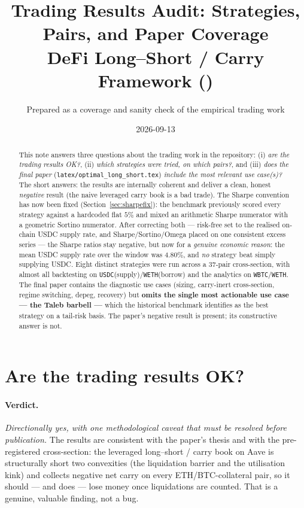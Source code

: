 \documentclass[11pt]{article}
\title{\textbf{Trading Results Audit: Strategies, Pairs, and Paper Coverage}\\[4pt]
\large DeFi Long--Short / Carry Framework (\code{Defi\_interestRate})}
\author{Prepared as a coverage and sanity check of the empirical trading work}
\date{2026-09-13}
\newcommand{\code}[1]{\texttt{\small #1}}
\begin{document}
\maketitle

\begin{abstract}
\noindent This note answers three questions about the trading work in the
repository: (i) \emph{are the trading results OK?}, (ii) \emph{which strategies
were tried, on which pairs?}, and (iii) \emph{does the final paper}
(\code{latex/optimal\_long\_short.tex}) \emph{include the most relevant use
case(s)?} The short answers: the results are internally coherent and deliver a
clean, honest \emph{negative} result (the naive leveraged carry book is a bad
trade). The Sharpe convention has now been fixed (Section~\ref{sec:sharpefix}):
the benchmark previously scored every strategy against a hardcoded flat $5\%$
and mixed an arithmetic Sharpe numerator with a geometric Sortino numerator.
After correcting both --- risk-free set to the realised on-chain USDC supply
rate, and Sharpe/Sortino/Omega placed on one consistent excess series --- the
Sharpe ratios stay negative, but now for a \emph{genuine economic reason}: the
mean USDC supply rate over the window was $4.80\%$, and \emph{no} strategy beat
simply supplying USDC. Eight distinct strategies were run across a 37-pair cross-section, with
almost all backtesting on \code{USDC}(supply)/\code{WETH}(borrow) and the
analytics on \code{WBTC}/\code{WETH}. The final paper contains the diagnostic
use cases (sizing, carry-inert cross-section, regime switching, depeg, recovery)
but \textbf{omits the single most actionable use case --- the Taleb barbell ---}
which the historical benchmark identifies as the best strategy on a tail-risk
basis. The paper's negative result is present; its constructive answer is not.
\end{abstract}

\section{Are the trading results OK?}

\paragraph{Verdict.} \emph{Directionally yes, with one methodological caveat that
must be resolved before publication.} The results are consistent with the
paper's thesis and with the pre-registered cross-section: the leveraged
long--short / carry book on Aave is structurally short two convexities (the
liquidation barrier and the utilisation kink) and collects negative net carry on
every ETH/BTC-collateral pair, so it should --- and does --- lose money once
liquidations are counted. That is a genuine, valuable finding, not a bug.
\end{document}
